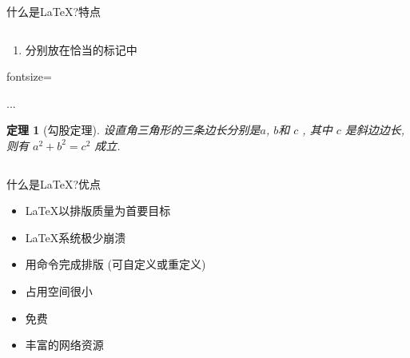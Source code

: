 \documentclass[fontset = none, xcolor=svgnames, t, aspectratio=169]{ctexbeamer}
\begin{document}
\begin{frame}[fragile]{什么是\LaTeX?}{特点}
\begin{spacing}{1.05}
\begin{columns}[T]
\begin{itemize}
\begin{enumerate}
      \item 分别\alert{放在恰当的标记中}
      \end{enumerate}
      \begin{minipage}[h]{0.8\linewidth}
          \begin{texcode*}{fontsize=\tiny}
           \usepackage{amsmath}
           \newtheorem{theorem}{定理}
           ...
           \begin{theorem}[勾股定理]
             设直⻆三⻆形的三条边⻓分别是$a$, $b$和 $c$ , 
             其中 $c$ 是斜边边⻓,则有 $a^2 + b^2 = c^2$ 成立.
           \end{theorem}
         \end{texcode*}
       \end{minipage}        
    \end{itemize}
  \end{columns}
  \end{spacing}
\end{frame}

\begin{frame}[t]{什么是\LaTeX?}{优点}
  \stretchon
  \begin{itemize}
  \item {\color{blue}{高质量的输出：}}\LaTeX{}以排版质量为首要目标
  \item {\color{blue}{超常的稳定性：}}\LaTeX{}系统极少崩溃
  \item {}用命令完成排版
    (可自定义或重定义)
  \item {}占用空间很小
  \item {\color{blue}{良好的通用性和低廉的价格：}}免费
  \item {\color{blue}{超强的技术支持：}}丰富的网络资源
  \end{itemize}
  \stretchoff
\end{frame}
\end{document}
